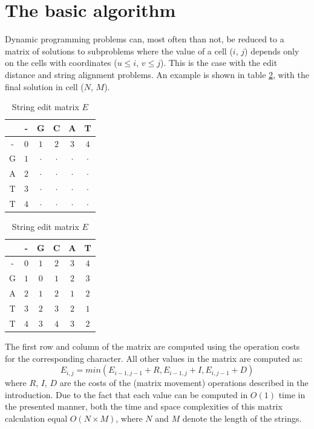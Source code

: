 \documentclass[times, utf8, seminar, numeric]{fer}
\begin{document}
\section{The basic algorithm}
Dynamic programming problems can, most often than not, be reduced to a matrix of solutions to subproblems where the value of a cell ($i$, $j$) depends only on the cells with coordinates ($u\leq i$, $v\leq j$). This is the case with the edit distance and string alignment problems. An example is shown in table \ref{tab:a}, with the final solution in cell ($N$, $M$).
\begin{table}[H]
\centering
\begin{tabular}{c|ccccc}
  & - & G & C & A & T\\
\hline
- & $0$ & $1$ & $2$ & $3$ & $4$ \\
G & $1$ & $\cdot$ & $\cdot$ & $\cdot$ & $\cdot$ \\
A & $2$ & $\cdot$ & $\cdot$ & $\cdot$ & $\cdot$ \\
T & $3$ & $\cdot$ & $\cdot$ & $\cdot$ & $\cdot$ \\
T & $4$ & $\cdot$ & $\cdot$ & $\cdot$ & $\cdot$ \\
\end{tabular}
\quad\quad
\begin{tabular}{c|ccccc}
  & - & G & C & A & T\\
\hline
- & $0$ & $1$ & $2$ & $3$ & $4$ \\
G & $1$ & $0$ & $1$ & $2$ & $3$ \\
A & $2$ & $1$ & $2$ & $1$ & $2$ \\
T & $3$ & $2$ & $3$ & $2$ & $1$ \\
T & $4$ & $3$ & $4$ & $3$ & $2$ \\
\end{tabular}
\caption{String edit matrix $E$}\label{tab:a}
\end{table}

The first row and column of the matrix are computed using the operation costs for the corresponding character. All other values in the matrix are computed as:
\begin{equation}
E_{i,j} = min(E_{i-1, j-1} + R, E_{i-1, j} + I, E_{i, j - 1} + D)
\end{equation}
where $R$, $I$, $D$ are the costs of the (matrix movement) operations described in the introduction.
Due to the fact that each value can be computed in $O(1)$ time in the presented manner, both the time and space complexities of this matrix calculation equal $O(N \times M)$, where $N$ and $M$ denote the length of the strings.
\end{document}
